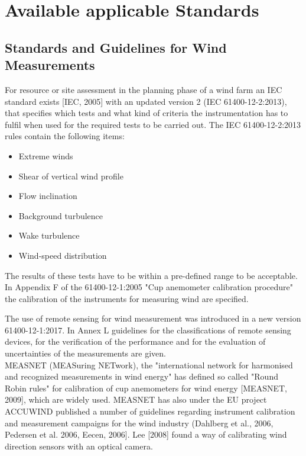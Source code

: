 \section{Available applicable Standards }
{\color{magenta}{Contributing author: COM}}{\color{blue}{ -- needs more attention}}

\subsection{Standards and Guidelines for Wind Measurements}\label{subsec:wind_standards}

For resource or site assessment in the planning phase of a wind farm an IEC standard exists [IEC, 2005] with an updated version 2 (IEC 61400-12-2:2013), that specifies which tests and what kind of criteria the instrumentation has to fulfil when used for the required tests to be carried out. The IEC 61400-12-2:2013 rules contain the following items:
\begin{itemize}
    \vspace{-0.2cm}\item Extreme winds
    \vspace{-0.4cm}\item Shear of vertical wind profile
    \vspace{-0.4cm}\item Flow inclination
    \vspace{-0.4cm}\item Background turbulence
    \vspace{-0.4cm}\item Wake turbulence
    \vspace{-0.4cm}\item Wind-speed distribution
\end{itemize}

The results of these tests have to be within a pre-defined range to be acceptable. In Appendix F of the 61400-12-1:2005 "Cup anemometer calibration procedure" the calibration of the instruments for measuring wind are specified.

The use of remote sensing for wind measurement was introduced in a new version 61400-12-1:2017. In Annex L guidelines for the classifications of remote sensing devices, for the verification of the performance and for the evaluation of uncertainties of the measurements are given. \\

MEASNET (MEASuring NETwork), the "international network for harmonised and recognized measurements in wind energy" has defined so called "Round Robin rules" for calibration of cup anemometers for wind energy [MEASNET, 2009], which are widely used. MEASNET has also under the EU project ACCUWIND published a number of guidelines regarding instrument calibration and measurement campaigns for the wind industry (Dahlberg et al., 2006, Pedersen et al. 2006, Eecen, 2006]. Lee [2008] found a way of calibrating wind direction sensors with an optical camera.

